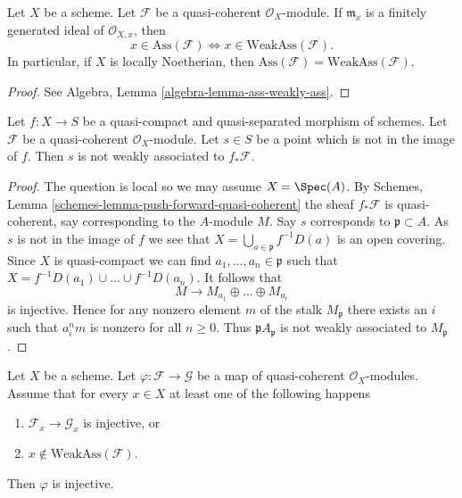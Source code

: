 \begin{lemma}
\label{lemma-ass-weakly-ass}
Let $X$ be a scheme.
Let $\mathcal{F}$ be a quasi-coherent $\mathcal{O}_X$-module.
If $\mathfrak m_x$ is a finitely generated ideal of $\mathcal{O}_{X, x}$,
then
$$
x \in \text{Ass}(\mathcal{F}) \Leftrightarrow
x \in \text{WeakAss}(\mathcal{F}).
$$
In particular, if $X$ is locally Noetherian, then
$\text{Ass}(\mathcal{F}) = \text{WeakAss}(\mathcal{F})$.
\end{lemma}

\begin{proof}
See
Algebra, Lemma \ref{algebra-lemma-ass-weakly-ass}.
\end{proof}

\begin{lemma}
\label{lemma-weakass-pushforward}
Let $f : X \to S$ be a quasi-compact and quasi-separated morphism of schemes.
Let $\mathcal{F}$ be a quasi-coherent $\mathcal{O}_X$-module.
Let $s \in S$ be a point which is not in the image of $f$. Then
$s$ is not weakly associated to $f_*\mathcal{F}$.
\end{lemma}

\begin{proof}
The question is local so we may assume $X = \Spec(A)$.
By Schemes, Lemma \ref{schemes-lemma-push-forward-quasi-coherent}
the sheaf $f_*\mathcal{F}$ is quasi-coherent, say corresponding
to the $A$-module $M$.
Say $s$ corresponds to $\mathfrak p \subset A$.
As $s$ is not in the image of $f$ we see that
$X = \bigcup_{a \in \mathfrak p} f^{-1}D(a)$ is an open covering.
Since $X$ is quasi-compact we can find $a_1, \ldots, a_n \in \mathfrak p$
such that $X = f^{-1}D(a_1) \cup \ldots \cup f^{-1}D(a_n)$. It follows
that
$$
M \to M_{a_1} \oplus \ldots \oplus M_{a_r}
$$
is injective. Hence for any nonzero element $m$ of the stalk $M_\mathfrak p$
there exists an $i$ such that $a_i^n m$ is nonzero for all $n \geq 0$.
Thus $\mathfrak pA_\mathfrak p$ is not weakly associated to $M_\mathfrak p$.
\end{proof}

\begin{lemma}
\label{lemma-check-injective-on-weakass}
Let $X$ be a scheme. Let $\varphi : \mathcal{F} \to \mathcal{G}$ be a map of
quasi-coherent $\mathcal{O}_X$-modules. Assume that for every $x \in X$
at least one of the following happens
\begin{enumerate}
\item $\mathcal{F}_x \to \mathcal{G}_x$ is injective, or
\item $x \not \in \text{WeakAss}(\mathcal{F})$.
\end{enumerate}
Then $\varphi$ is injective.
\end{lemma}

